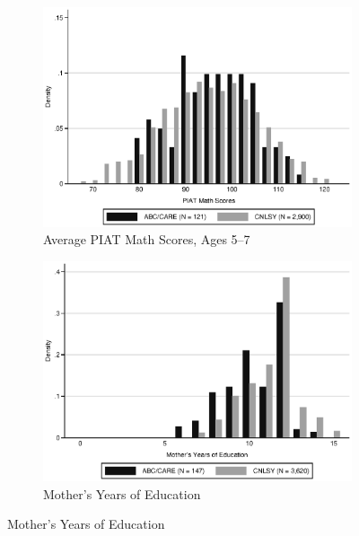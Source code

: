 \begin{figure}[H]
		\caption{Support of ABC/CARE and Auxiliary Data} \label{fig:support}
	\begin{subfigure}[h]{0.8\textwidth}
	\centering
	\caption{Average PIAT Math Scores, Ages 5--7} \label{fig:support_math}
	\includegraphics[width=\textwidth]{AppOutput/Methodology/support_math.eps}
	\end{subfigure}
	
	\begin{subfigure}[h]{0.8\textwidth}
	\centering
	\caption{Mother's Years of Education} \label{fig:support_meduc}
	\includegraphics[width=\textwidth]{AppOutput/Methodology/support_momed.eps}
	\end{subfigure}
	
\end{figure}

